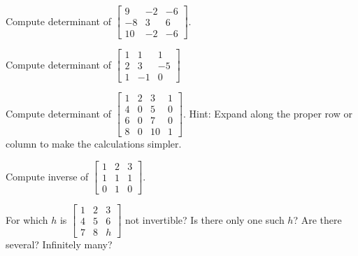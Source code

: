 \documentclass{ximera}
\begin{document}
\begin{exercise}
    Compute determinant of
    $\left[ 
        \begin{smallmatrix}
            9 & -2 & -6 \\
            -8 & 3 & 6 \\
            10 & -2 & -6
        \end{smallmatrix} 
    \right]$.
\end{exercise}

\begin{exercise}%
    Compute determinant of
    $\left[ 
        \begin{smallmatrix}
            1 & 1 & 1 \\
            2 & 3 & -5 \\
            1 & -1 & 0
        \end{smallmatrix}
    \right]$
\end{exercise}

\begin{exercise}
    Compute determinant of
    $\left[ 
        \begin{smallmatrix}
            1 & 2 & 3 & 1 \\
            4 & 0 & 5 & 0 \\
            6 & 0 & 7 & 0 \\
            8 & 0 & 10 & 1
        \end{smallmatrix} 
    \right]$.  
    Hint: Expand along the proper row or column to make the calculations simpler.
\end{exercise}

\begin{exercise}
    Compute inverse of
    $\left[ 
        \begin{smallmatrix}
            1 & 2 & 3 \\
            1 & 1 & 1 \\
            0 & 1 & 0
        \end{smallmatrix} 
    \right]$.
\end{exercise}

\begin{exercise}
    For which $h$ is
    $\left[ 
        \begin{smallmatrix}
            1 & 2 & 3 \\
            4 & 5 & 6 \\
            7 & 8 & h
        \end{smallmatrix} 
    \right]$
    not invertible?  Is there only one such $h$?  Are there several?  Infinitely many?
\end{exercise}
\end{document}
